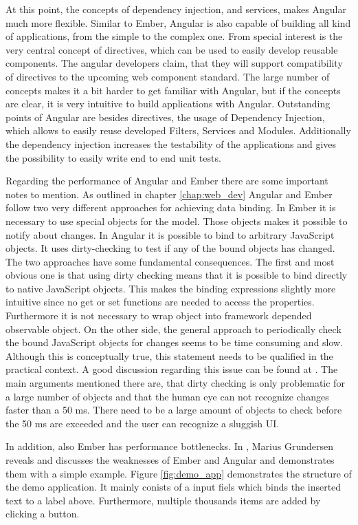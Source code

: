 At this point, the concepts of dependency injection, and services, makes Angular much more flexible.
Similar to Ember, Angular is also capable of building all kind of applications, from the simple to the complex one.
From special interest is the very central concept of directives, which can be used to easily develop reusable components. The angular developers claim, that they will support compatibility of directives to the upcoming web component standard.
The large number of concepts makes it a bit harder to get familiar with Angular, but if the concepts are clear, it is very intuitive to build applications with Angular.
Outstanding points of Angular are besides directives, the usage of Dependency Injection, which allows to easily reuse developed Filters, Services and Modules. Additionally the dependency injection increases the testability of the applications and gives the possibility to easily write end to end unit tests. 

Regarding the performance of Angular and Ember there are some important notes to mention. As outlined in chapter \ref{chap:web_dev} Angular and Ember follow two very different approaches for achieving data binding.
In Ember it is necessary to use special objects for the model. Those objects makes it possible to notify about changes.
In Angular it is possible to bind to arbitrary JavaScript objects. It uses dirty-checking to test if any of the bound objects has changed.
The two approaches have some fundamental consequences.
The first and most obvious one is that using dirty checking means that it is possible to bind directly to native JavaScript objects.
This makes the binding expressions slightly more intuitive since no get or set functions are needed to access the properties.
Furthermore it is not necessary to wrap object into  framework depended observable object.
On the other side, the general approach to periodically check the bound JavaScript objects for changes seems to be time consuming and slow.
Although this is conceptually true, this statement needs to be qualified in the practical context.
A good discussion regarding this issue can be found at \autocite{tech-ana:ng-binding}.
The main arguments mentioned there are, that dirty checking is only problematic for a large number of objects and that the human eye can not recognize changes faster than a 50 ms.
There need to be a large amount of objects to check before the 50 ms are exceeded and the user can recognize a sluggish UI.

In addition, also Ember has performance bottlenecks. 
In \autocite{binding_comparison}, Marius Grundersen reveals and discusses the weaknesses of Ember and Angular and demonstrates them with a simple example. 
Figure \ref{fig:demo_app} demonstrates the structure of the demo application. It mainly conists of a input fiels which binds the inserted text to a label above. 
Furthermore, multiple thousands items are added by clicking a button. 

